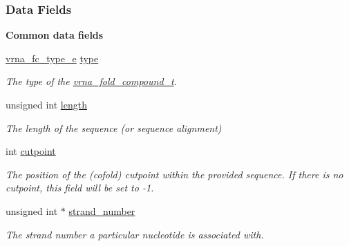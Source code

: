 \subsubsection*{Data Fields}
\begin{Indent}\textbf{ Common data fields}\par
\begin{DoxyCompactItemize}
\item 
\hyperlink{group__fold__compound_ga01a4ff86fa71deaaa5d1abbd95a1447d}{vrna\+\_\+fc\+\_\+type\+\_\+e} \hyperlink{group__fold__compound_ac5eab693deac9a1a40c2a95ac294707c}{type}
\begin{DoxyCompactList}\small\item\em The type of the \hyperlink{group__fold__compound_ga1b0cef17fd40466cef5968eaeeff6166}{vrna\+\_\+fold\+\_\+compound\+\_\+t}. \end{DoxyCompactList}\item 
\mbox{\label{group__fold__compound_a95fbfed770b858e50c766505dc4bf998}} 
unsigned int \hyperlink{group__fold__compound_a95fbfed770b858e50c766505dc4bf998}{length}
\begin{DoxyCompactList}\small\item\em The length of the sequence (or sequence alignment) \end{DoxyCompactList}\item 
\mbox{\label{group__fold__compound_ae1a7bbff0256577e2b22709bac11fdb4}} 
int \hyperlink{group__fold__compound_ae1a7bbff0256577e2b22709bac11fdb4}{cutpoint}
\begin{DoxyCompactList}\small\item\em The position of the (cofold) cutpoint within the provided sequence. If there is no cutpoint, this field will be set to -\/1. \end{DoxyCompactList}\item 
\mbox{\label{group__fold__compound_a23304c5186dfae97bc69dc19d37f70c3}} 
unsigned int $\ast$ \hyperlink{group__fold__compound_a23304c5186dfae97bc69dc19d37f70c3}{strand\+\_\+number}
\begin{DoxyCompactList}\small\item\em The strand number a particular nucleotide is associated with. \end{DoxyCompactList}\item 
\mbox{\label{group__fold__compound_a3bf15e0e44539f9f622fd09227bf3de1}} 

\end{DoxyCompactItemize}
\end{Indent}
